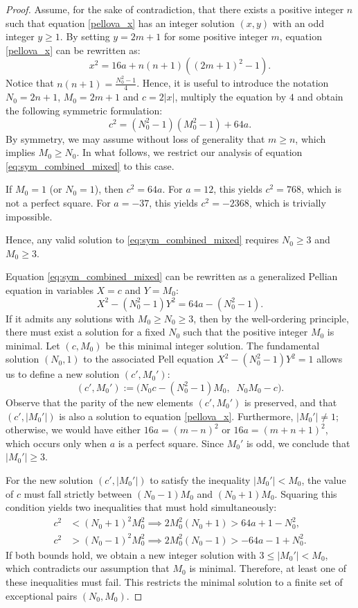 \documentclass[12pt]{amsart}
\theoremstyle{definition}
\begin{document}
\begin{proof}
Assume, for the sake of contradiction, that there exists a positive integer $n$ such that equation \eqref{pellova_x} has an integer solution $(x, y)$ with an odd integer $y \ge 1$. 
By setting $y = 2m+1$ for some positive integer $m$, equation \eqref{pellova_x} can be rewritten as:
$$ x^2 = 16a + n(n+1)((2m+1)^2-1). $$
Notice that $n(n+1) = \frac{N_0^2-1}{4}$. Hence, it is useful to introduce the notation $N_0 = 2n+1$, $M_0 = 2m+1$ and $c = 2|x|$, multiply the equation by $4$ and obtain the following symmetric formulation:
\begin{equation} \label{eq:sym_combined_mixed}
c^2 = (N_0^2-1)(M_0^2-1) + 64a.
\end{equation}
By symmetry, we may assume without loss of generality that $m \geq n$, which implies $M_0 \geq N_0$. In what follows, we restrict our analysis of equation \eqref{eq:sym_combined_mixed} to this case.

If $M_0 = 1$ (or $N_0 = 1$), then  $c^2 = 64a$. 
 For $a=12$, this yields $c^2 = 768$, which is not a perfect square.
    For $a=-37$, this yields $c^2 = -2368$, which is trivially impossible.

Hence, any valid solution to \eqref{eq:sym_combined_mixed} requires $N_0 \ge 3$ and $M_0 \ge 3$. 

Equation \eqref{eq:sym_combined_mixed} can be rewritten as a generalized Pellian equation in variables $X=c$ and $Y=M_0$:
$$ X^2 - (N_0^2-1)Y^2 = 64a - (N_0^2-1). $$
If it admits any solutions with $M_0 \ge N_0 \ge 3$, then by the well-ordering principle, there must exist a solution for a fixed $N_0$ such that the positive integer $M_0$ is minimal. 
Let $(c, M_0)$ be this minimal integer solution. The fundamental solution $(N_0, 1)$ to the associated Pell equation $X^2 - (N_0^2-1)Y^2 = 1$ allows us to define a new solution $(c', M_0')$:
$$ (c', M_0') := \bigl(N_0 c - (N_0^2-1)M_0,\;\; N_0 M_0 - c\bigr). $$
Observe that the parity of the new elements $(c', M_0')$ is preserved, and that $(c', |M_0'|)$ is also a solution to equation \eqref{pellova_x}. 
Furthermore, $|M_0'| \neq 1$; otherwise, we would have either $16a=(m-n)^2$ or $16a=(m+n+1)^2$, which occurs only when $a$ is a perfect square. Since $M_0'$ is odd, we conclude that $|M_0'| \ge 3$.

For the new solution $(c', |M_0'|)$ to satisfy the  inequality $|M_0'| < M_0$, the value of $c$ must fall strictly between $(N_0-1)M_0$ and $(N_0+1)M_0$. Squaring this condition yields two inequalities that must hold simultaneously:
\begin{align}
    c^2 &< (N_0+1)^2 M_0^2 \implies 2M_0^2(N_0+1) > 64a + 1 - N_0^2, \label{upper_bound} \\
    c^2 &> (N_0-1)^2 M_0^2 \implies 2M_0^2(N_0-1) > -64a - 1 + N_0^2. \label{lower_bound}
\end{align}
If both bounds hold, we obtain a new integer solution with $3 \le |M_0'| < M_0$, which contradicts our assumption that $M_0$ is minimal. Therefore,  at least one of these inequalities must fail. This restricts the minimal solution to a finite set of exceptional pairs $(N_0, M_0)$.



\end{proof}
\end{document}
